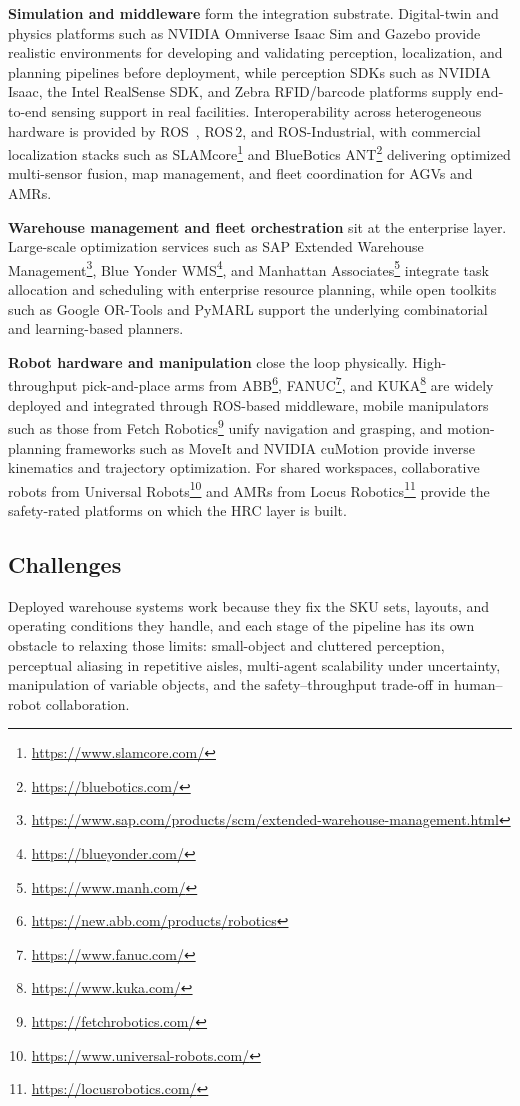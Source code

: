 \textbf{Simulation and middleware} form the integration substrate. Digital-twin and physics platforms such as NVIDIA Omniverse Isaac Sim \cite{NVIDIA2021Isaac} and Gazebo provide realistic environments for developing and validating perception, localization, and planning pipelines before deployment, while perception SDKs such as NVIDIA Isaac, the Intel RealSense SDK, and Zebra RFID/barcode platforms  supply end-to-end sensing support in real facilities. Interoperability across heterogeneous hardware is provided by ROS~\cite{Quigley2009ROSIndustrial}, ROS\,2, and ROS-Industrial, with commercial localization stacks such as SLAMcore\footnote{\url{https://www.slamcore.com/}} and BlueBotics ANT\footnote{\url{https://bluebotics.com/}} delivering optimized multi-sensor fusion, map management, and fleet coordination for AGVs and AMRs.

\textbf{Warehouse management and fleet orchestration} sit at the enterprise layer. Large-scale optimization services such as SAP Extended Warehouse Management\footnote{\url{https://www.sap.com/products/scm/extended-warehouse-management.html}}, Blue Yonder WMS\footnote{\url{https://blueyonder.com/}}, and Manhattan Associates\footnote{\url{https://www.manh.com/}} integrate task allocation and scheduling with enterprise resource planning, while open toolkits such as Google OR-Tools \cite{Perron2019ORTools} and PyMARL support the underlying combinatorial and learning-based planners.

\textbf{Robot hardware and manipulation} close the loop physically. High-throughput pick-and-place arms from ABB\footnote{\url{https://new.abb.com/products/robotics}}, FANUC\footnote{\url{https://www.fanuc.com/}}, and KUKA\footnote{\url{https://www.kuka.com/}} are widely deployed and integrated through ROS-based middleware, mobile manipulators such as those from Fetch Robotics\footnote{\url{https://fetchrobotics.com/}} unify navigation and grasping, and motion-planning frameworks such as MoveIt \cite{Sucan2010MoveIt} and NVIDIA cuMotion provide inverse kinematics and trajectory optimization. For shared workspaces, collaborative robots from Universal Robots\footnote{\url{https://www.universal-robots.com/}} and AMRs from Locus Robotics\footnote{\url{https://locusrobotics.com/}} provide the safety-rated platforms on which the HRC layer is built.






\subsection{Challenges}
\label{subsec:p4-sec9-5-challenges}
Deployed warehouse systems work because they fix the SKU sets, layouts, and operating conditions they handle, and each stage of the pipeline has its own obstacle to relaxing those limits: small-object and cluttered perception, perceptual aliasing in repetitive aisles, multi-agent scalability under uncertainty, manipulation of variable objects, and the safety--throughput trade-off in human--robot collaboration.

